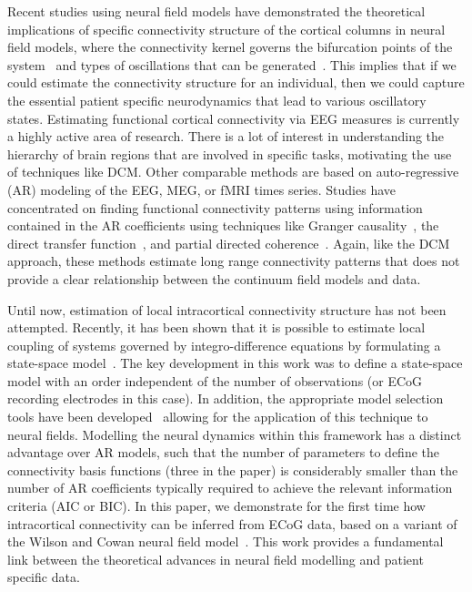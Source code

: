 \documentclass[12pt]{iopart}		%
\begin{document}
Recent studies using neural field models have demonstrated the theoretical implications of specific connectivity structure of the cortical columns in neural field models, where the connectivity kernel governs the bifurcation points of the system~\cite{Hutt2005} and types of oscillations that can be generated~\cite{Schmidt2009}. This implies that if we could estimate the connectivity structure for an individual, then we could capture the essential patient specific neurodynamics that lead to various oscillatory states. Estimating functional cortical connectivity via EEG measures is currently a highly active area of research. There is a lot of interest in understanding the hierarchy of brain regions that are involved in specific tasks, motivating the use of techniques like DCM. Other comparable methods are based on auto-regressive (AR) modeling of the EEG, MEG, or fMRI times series. Studies have concentrated on finding functional connectivity patterns using information contained in the AR coefficients using techniques like Granger causality~\cite{Hesse2003}, the direct transfer function~\cite{Kaminski1991}, and partial directed coherence~\cite{Sameshima1999}. Again, like the DCM approach, these methods estimate long range connectivity patterns that does not provide a clear relationship between the continuum field models and data.

Until now, estimation of local intracortical connectivity structure has not been attempted. Recently, it has been shown that it is possible to estimate local coupling of systems governed by integro-difference equations by formulating a state-space model~\cite{Dewar2009}. The key development in this work was to define a state-space model with an order independent of the number of observations (or ECoG recording electrodes in this case). In addition, the appropriate model selection tools have been developed~\cite{Scerri2009} allowing for the application of this technique to neural fields. Modelling the neural dynamics within this framework has a distinct advantage over AR models, such that the number of parameters to define the connectivity basis functions (three in the paper) is considerably smaller than the number of AR coefficients typically required to achieve the relevant information criteria (AIC or BIC). In this paper, we demonstrate for the first time how intracortical connectivity can be inferred from ECoG data, based on a variant of the  Wilson and Cowan neural field model~\cite{Wilson1973}. This work provides a fundamental link between the theoretical advances in neural field modelling and patient specific data.
\end{document}
